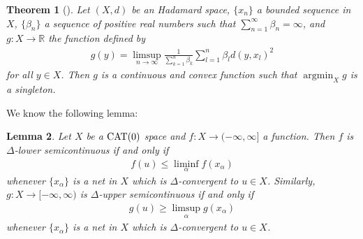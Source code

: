 \documentclass[draft]{amsart}
\numberwithin{equation}{section}
\def\R{\mathbb R}
\DeclareMathOperator*{\Argmin}{argmin}
\newcommand{\CAT}{\textup{CAT}}
\theoremstyle{plain}
\newtheorem{theorem}{Theorem}[section]
\newtheorem{lemma}[theorem]{Lemma}
\theoremstyle{definition}
\theoremstyle{remark}
\begin{document}
\begin{theorem}[\cite{MR3574140}]\label{thm:Kimura-K-bdd}
 Let $(X,d)$ be an Hadamard space, 
 $\{x_n\}$ a bounded sequence in $X$, 
 $\{\beta_n\}$ a sequence of positive real numbers such that 
 $\sum_{n=1}^{\infty}\beta_n =\infty$, 
 and $g\colon X\to \R$ the function defined by 
 \begin{align}
  g(y)=\limsup_{n\to \infty}\frac{1}{\sum_{k=1}^n\beta_k}
  \sum_{l=1}^n \beta_l d(y,x_l)^2
 \end{align}
 for all $y\in X$. Then $g$ is a continuous and convex function such that 
 $\Argmin_X g$ is a singleton. 
\end{theorem}

We know the following lemma: 
\begin{lemma}
Let $X$ be a $\CAT(0)$ space and $f\colon X\to (-\infty, \infty]$ 
a function. 
Then $f$ is $\Delta$-lower semicontinuous if and only if 
\begin{align}
 f(u)\leq \liminf_{\alpha}f(x_{\alpha})
\end{align}
whenever 
$\{x_{\alpha}\}$ is a net in $X$ which is $\Delta$-convergent 
to $u\in X$.  
Similarly, $g\colon X\to [-\infty, \infty)$ 
is $\Delta$-upper semicontinuous if and only if 
\begin{align}
 g(u)\geq \limsup_{\alpha}g(x_{\alpha})
\end{align}
whenever $\{x_{\alpha}\}$ is a net in $X$ which is $\Delta$-convergent 
to $u\in X$. 
\end{lemma}
\end{document}
